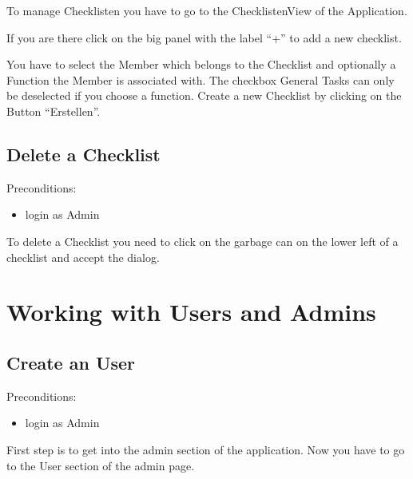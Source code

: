 \documentclass[letterpaper,10pt,english]{sphinxmanual}
\begin{document}
To manage Checklisten you have to go to the Checklisten\sphinxhyphen{}View of the Application.

\noindent{}

If you are there click on the big panel with the label “+” to add a new
checklist.

\noindent{}

You have to select the Member which belongs to the Checklist and optionally a
Function the Member is associated with. The checkbox General
Tasks can only be deselected if you choose a function. Create a new Checklist by
clicking on the Button “Erstellen”.

\noindent{}


\subsection{Delete a Checklist}
\label{\detokenize{masterUserDoc:delete-a-checklist}}
Pre\sphinxhyphen{}conditions:
\begin{itemize}
\item {} 
login as Admin

\end{itemize}

To delete a Checklist you need to click on the garbage can on the lower left
of a checklist and accept the dialog.

\noindent{}


\section{Working with Users and Admins}
\label{\detokenize{masterUserDoc:working-with-users-and-admins}}

\subsection{Create an User}
\label{\detokenize{masterUserDoc:create-an-user}}
Pre\sphinxhyphen{}conditions:
\begin{itemize}
\item {} 
login as Admin

\end{itemize}

First step is to get into the admin section of the application.
Now you have to go to the User section of the admin page.
\end{document}
